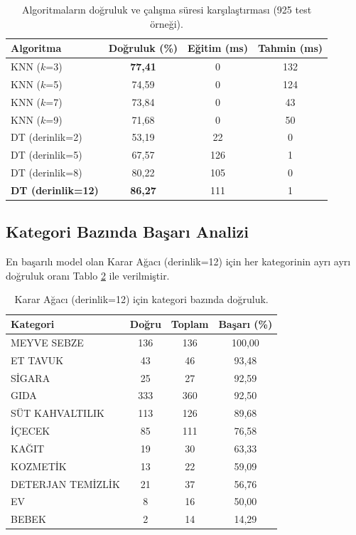 \documentclass[conference]{IEEEtran}
\begin{document}
\begin{table}[H]
\caption{Algoritmaların doğruluk ve çalışma süresi karşılaştırması (925 test örneği).}
\label{tab:karsilastirma}
\centering
\renewcommand{\arraystretch}{1.2}
\begin{tabular}{l|c|c|c}
\hline
\textbf{Algoritma} & \textbf{Doğruluk (\%)} & \textbf{Eğitim (ms)} & \textbf{Tahmin (ms)} \\
\hline
KNN ($k$=3)        & \textbf{77,41} & 0   & 132 \\
KNN ($k$=5)        & 74,59 & 0   & 124 \\
KNN ($k$=7)        & 73,84 & 0   & 43  \\
KNN ($k$=9)        & 71,68 & 0   & 50  \\
\hline
DT (derinlik=2)    & 53,19 & 22  & 0   \\
DT (derinlik=5)    & 67,57 & 126 & 1   \\
DT (derinlik=8)    & 80,22 & 105 & 0   \\
\textbf{DT (derinlik=12)} & \textbf{86,27} & 111 & 1 \\
\hline
\end{tabular}
\end{table}

\subsection{Kategori Bazında Başarı Analizi}

En başarılı model olan Karar Ağacı (derinlik=12) için her kategorinin ayrı ayrı doğruluk oranı Tablo \ref{tab:kategori} ile verilmiştir.

\begin{table}[H]
\caption{Karar Ağacı (derinlik=12) için kategori bazında doğruluk.}
\label{tab:kategori}
\centering
\renewcommand{\arraystretch}{1.15}
\begin{tabular}{l|c|c|c}
\hline
\textbf{Kategori} & \textbf{Doğru} & \textbf{Toplam} & \textbf{Başarı (\%)} \\
\hline
MEYVE SEBZE       & 136 & 136 & 100,00 \\
ET TAVUK          & 43  & 46  & 93,48  \\
SİGARA            & 25  & 27  & 92,59  \\
GIDA              & 333 & 360 & 92,50  \\
SÜT KAHVALTILIK   & 113 & 126 & 89,68  \\
İÇECEK            & 85  & 111 & 76,58  \\
KAĞIT             & 19  & 30  & 63,33  \\
KOZMETİK          & 13  & 22  & 59,09  \\
DETERJAN TEMİZLİK & 21  & 37  & 56,76  \\
EV                & 8   & 16  & 50,00  \\
BEBEK             & 2   & 14  & 14,29  \\
\hline
\end{tabular}
\end{table}
\end{document}
